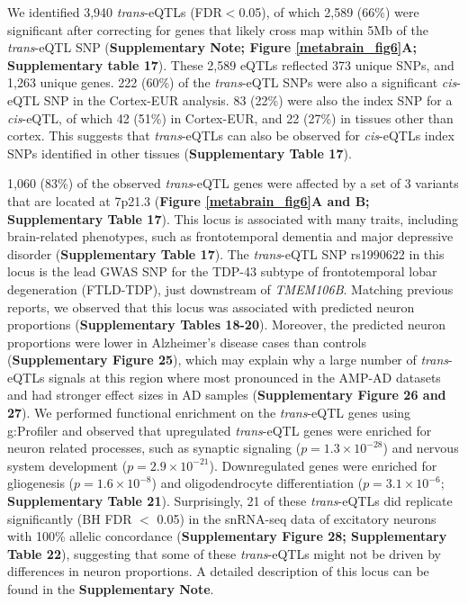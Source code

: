 We identified 3,940 \textit{trans}-eQTLs (FDR$<$0.05), of which 2,589 (66\%) were significant after correcting for genes that likely cross map within 5Mb of the \textit{trans}-eQTL SNP (\textbf{Supplementary Note; Figure \ref{metabrain_fig6}A; Supplementary table 17}). These 2,589 eQTLs reflected 373 unique SNPs, and 1,263 unique genes.  222 (60\%) of the \textit{trans}-eQTL SNPs were also a significant \textit{cis}-eQTL SNP in the Cortex-EUR analysis. 83 (22\%) were also the index SNP for a \textit{cis}-eQTL, of which 42 (51\%) in Cortex-EUR, and 22 (27\%) in tissues other than cortex. This suggests that \textit{trans}-eQTLs can also be observed for \textit{cis}-eQTLs index SNPs identified in other tissues (\textbf{Supplementary Table 17}). 

1,060 (83\%) of the observed \textit{trans}-eQTL genes were affected by a set of 3 variants that are located at 7p21.3 (\textbf{Figure \ref{metabrain_fig6}A and B; Supplementary Table 17}). This locus is associated with many traits, including brain-related phenotypes, such as frontotemporal dementia\cite{ferrariFrontotemporalDementiaIts2014} and major depressive disorder\cite{sankaranHumanFetalHemoglobin2008} (\textbf{Supplementary Table 17}). The \textit{trans}-eQTL SNP rs1990622 in this locus is the lead GWAS SNP for the TDP-43 subtype of frontotemporal lobar degeneration (FTLD-TDP)\cite{jiangCMYBInvolvedRegulation2006}, just downstream of \textit{TMEM106B}. Matching previous reports\cite{metaisGenomeEditingHBG12019,jDalfampridineBriefReview2011}, we observed that this locus was associated with predicted neuron proportions (\textbf{Supplementary Tables 18-20}). Moreover, the predicted neuron proportions were lower in Alzheimer’s disease cases than controls (\textbf{Supplementary Figure 25}), which may explain why a large number of \textit{trans}-eQTLs signals at this region where most pronounced in the AMP-AD datasets and had stronger effect sizes in AD samples (\textbf{Supplementary Figure 26 and 27}). We performed functional enrichment on the \textit{trans}-eQTL genes using g:Profiler\cite{raudvereProfilerWebServer2019} and observed that upregulated \textit{trans}-eQTL genes were enriched for neuron related processes, such as synaptic signaling ($p=1.3 \times 10^{-28}$) and nervous system development ($p=2.9 \times 10^{-21}$). Downregulated genes were enriched for gliogenesis ($p=1.6 \times 10^{-8}$) and oligodendrocyte differentiation ($p=3.1 \times 10^{-6}$; \textbf{Supplementary Table 21}). Surprisingly, 21 of these \textit{trans}-eQTLs did replicate significantly (BH FDR $<$ 0.05) in the snRNA-seq data of excitatory neurons with 100\% allelic concordance (\textbf{Supplementary Figure 28; Supplementary Table 22}), suggesting that some of these \textit{trans}-eQTLs might not be driven by differences in neuron proportions. A detailed description of this locus can be found in the \textbf{Supplementary Note}. 

